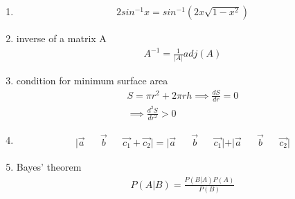 \begin{enumerate}[label=\thesubsection.\arabic*, ref=\thesubsection.\theenumi]
\begin{align}
     \int f(x)g(x)dx=f(x)\int g(x)dx-\int f^\prime (x)\left(\int g(x)dx\right) dx \label{eq:ee26btech11222-prob 21}
 \end{align}
 \item 
 \begin{align}
 	2sin^{-1}x= sin^{-1}(2x\sqrt{1-x^2}) \label{eq:ee26btech11222-prob-27}
 \end{align}
 \item inverse of a matrix A
 \begin{align}
     A^{-1}= \frac{1}{\vert{}A\vert{}}adj(A) \label{eq:ee26btech11222-prob-34 }
 \end{align}

 \item condition for minimum surface area 
 \begin{align}
     S=\pi r^2+2\pi rh \implies \frac{dS}{dr}=0 \\ \implies \frac{d^2S}{dr^2}>0 \label{eq:ee26btech11222-prob 30}
 \end{align}
 \item
 \begin{align}
     \vert{}\vec{a}&&\vec{b}&& \vec{c_1}+\vec{c_2}\vert{}=|\vec{a}&&\vec{b} &&\vec{c_1}|+|\vec{a}&&\vec{b}&&\vec{c_2}|
 \end{align}
 \item Bayes' theorem 
 \begin{align}
     P(A|B)=\frac{P(B|A)P(A)}{P(B)} \label{eq:ee26btech11222-prob 33}
 \end{align}
\end{enumerate}
